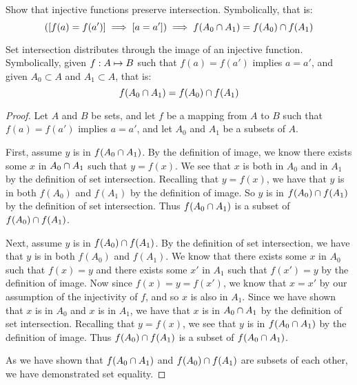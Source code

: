 \documentclass[main.tex]{subfiles}
\begin{document}
\subproblem{}\label{s2p2g}

Show that injective functions preserve intersection. Symbolically, that is:
\[([f(a) = f(a')] \implies [a = a']) \implies f(A_0 \cap A_1) = f(A_0) \cap f(A_1)\]

\begin{thm}
	Set intersection distributes through the image of an injective function.
	Symbolically, given \({f}: {A} \mapsto{} {B}\) such that
	\(f(a) = f(a')\) implies \(a = a'\), and given \(A_0 \subset A\) and
	\(A_1 \subset A\), that is:
	\[f(A_0 \cap A_1) = f(A_0) \cap f(A_1)\]
\end{thm}
\begin{proof}
	Let \(A\) and \(B\) be sets, and let \(f\) be a mapping from \(A\) to
	\(B\) such that \(f(a) = f(a')\) implies \(a = a'\), and let \(A_0\) and
	\(A_1\) be a subsets of \(A\).

	First, assume \(y\) is in \(f(A_0 \cap A_1)\). By the definition
	of image, we know there exists some \(x\) in \(A_0 \cap A_1\) such
	that \(y = f(x)\). We see that \(x\) is both in \(A_0\) and in \(A_1\)
	by the definition of set intersection. Recalling that \(y = f(x)\), we
	have that \(y\) is in both \(f(A_0)\) and \(f(A_1)\) by the definition
	of image. So \(y\) is in \(f(A_0) \cap f(A_1)\) by the definition
	of set intersection. Thus \(f(A_0 \cap A_1)\) is a subset of
	\(f(A_0) \cap f(A_1)\).

	Next, assume \(y\) is in \(f(A_0) \cap f(A_1)\). By the definition
	of set intersection, we have that \(y\) is in both \(f(A_0)\) and
	\(f(A_1)\). We know that there exists some \(x\) in \(A_0\) such that
	\(f(x) = y\) and there exists some \(x'\) in \(A_1\) such that
	\(f(x') = y\) by the definition of image. Now since
	\(f(x) = y = f(x')\), we know that \(x = x'\) by our assumption of the
	injectivity of \(f\), and so \(x\) is also in \(A_1\). Since we have
	shown that \(x\) is in \(A_0\) and \(x\) is in \(A_1\), we have that
	\(x\) is in \(A_0 \cap A_1\) by the definition of set
	intersection. Recalling that \(y = f(x)\), we see that \(y\) is in
	\(f(A_0 \cap A_1)\) by the definition of image. Thus
	\(f(A_0) \cap f(A_1)\) is a subset of \(f(A_0 \cap A_1)\).

	As we have shown that \(f(A_0 \cap A_1)\) and
	\(f(A_0) \cap f(A_1)\) are subsets of each other, we have
	demonstrated set equality.
\end{proof}
\end{document}
